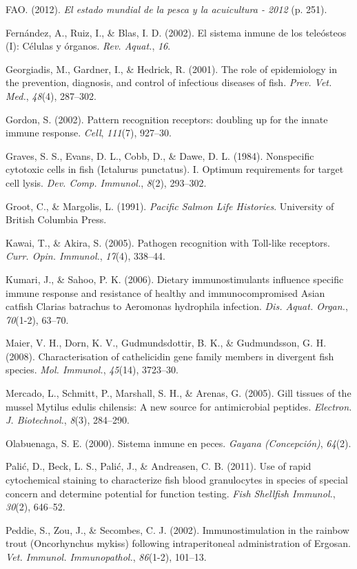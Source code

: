 \documentclass[11pt,a4paper,]{article}
\begin{document}
FAO. (2012). \emph{El estado mundial de la pesca y la acuicultura -
2012} (p. 251).

Fernández, A., Ruiz, I., \& Blas, I. D. (2002). El sistema inmune de los
teleósteos (I): Células y órganos. \emph{Rev. Aquat.}, \emph{16}.

Georgiadis, M., Gardner, I., \& Hedrick, R. (2001). The role of
epidemiology in the prevention, diagnosis, and control of infectious
diseases of fish. \emph{Prev. Vet. Med.}, \emph{48}(4), 287--302.

Gordon, S. (2002). Pattern recognition receptors: doubling up for the
innate immune response. \emph{Cell}, \emph{111}(7), 927--30.

Graves, S. S., Evans, D. L., Cobb, D., \& Dawe, D. L. (1984).
Nonspecific cytotoxic cells in fish (Ictalurus punctatus). I. Optimum
requirements for target cell lysis. \emph{Dev. Comp. Immunol.},
\emph{8}(2), 293--302.

Groot, C., \& Margolis, L. (1991). \emph{Pacific Salmon Life Histories}.
University of British Columbia Press.

Kawai, T., \& Akira, S. (2005). Pathogen recognition with Toll-like
receptors. \emph{Curr. Opin. Immunol.}, \emph{17}(4), 338--44.

Kumari, J., \& Sahoo, P. K. (2006). Dietary immunostimulants influence
specific immune response and resistance of healthy and immunocompromised
Asian catfish Clarias batrachus to Aeromonas hydrophila infection.
\emph{Dis. Aquat. Organ.}, \emph{70}(1-2), 63--70.

Maier, V. H., Dorn, K. V., Gudmundsdottir, B. K., \& Gudmundsson, G. H.
(2008). Characterisation of cathelicidin gene family members in
divergent fish species. \emph{Mol. Immunol.}, \emph{45}(14), 3723--30.

Mercado, L., Schmitt, P., Marshall, S. H., \& Arenas, G. (2005). Gill
tissues of the mussel Mytilus edulis chilensis: A new source for
antimicrobial peptides. \emph{Electron. J. Biotechnol.}, \emph{8}(3),
284--290.

Olabuenaga, S. E. (2000). Sistema inmune en peces. \emph{Gayana
(Concepción)}, \emph{64}(2).

Palić, D., Beck, L. S., Palić, J., \& Andreasen, C. B. (2011). Use of
rapid cytochemical staining to characterize fish blood granulocytes in
species of special concern and determine potential for function testing.
\emph{Fish Shellfish Immunol.}, \emph{30}(2), 646--52.

Peddie, S., Zou, J., \& Secombes, C. J. (2002). Immunostimulation in the
rainbow trout (Oncorhynchus mykiss) following intraperitoneal
administration of Ergosan. \emph{Vet. Immunol. Immunopathol.},
\emph{86}(1-2), 101--13.
\end{document}
